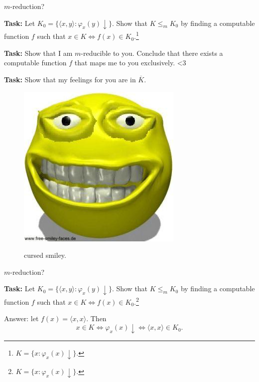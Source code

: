 \documentclass{beamer}
\begin{document}
\begin{frame}{$m$-reduction? \emojiflushed}

\textbf{Task:} Let $K_0 = \{\langle x, y \rangle: \varphi_x(y) \downarrow\}$. Show that $K \leq_m K_0$ by finding a computable function $f$ such that $x \in K \Leftrightarrow f(x) \in K_0$.\footnote{$K = \{x: \varphi_x(x) \downarrow\}$.}

\vspace{2mm}

{\color{red} \textbf{Task:} Show that I am $m$-reducible to you. Conclude that there exists a computable function $f$ that maps me to you exclusively. \textless 3}

\vspace{2mm}

{\color{red} \textbf{Task:} Show that my feelings for you are in $\overline{K}$. }

\begin{figure}[h]
\centering
\includegraphics[scale=0.3]{img/free_smiley.jpg}

cursed smiley.
\end{figure}

\end{frame}

\begin{frame}{$m$-reduction? \emojiflushed}

\textbf{Task:} Let $K_0 = \{\langle x, y \rangle: \varphi_x(y) \downarrow\}$. Show that $K \leq_m K_0$ by finding a computable function $f$ such that $x \in K \Leftrightarrow f(x) \in K_0$.\footnote{$K = \{x: \varphi_x(x) \downarrow\}$.}

\vspace{2mm}

Answer: let $f(x) = \langle x, x \rangle$. Then
$$x \in K \Leftrightarrow \varphi_x(x) \downarrow \Leftrightarrow \langle x, x \rangle \in K_0.$$

\end{frame}
\end{document}
